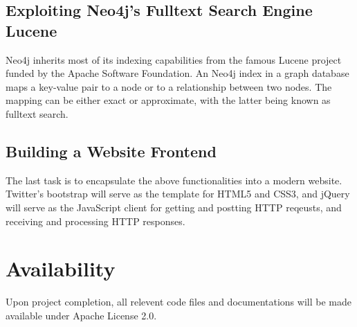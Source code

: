 \documentclass[10pt,conference,compsocconf]{../IEEEtran}
\begin{document}
\subsection{Exploiting Neo4j's Fulltext Search Engine Lucene}

Neo4j inherits most of its indexing capabilities from the famous Lucene project funded by the Apache Software Foundation. An Neo4j index in a graph database maps a key-value pair to a node or to a relationship between two nodes. The mapping can be either exact or approximate, with the latter being known as fulltext search.

\subsection{Building a Website Frontend}

The last task is to encapsulate the above functionalities into a modern website. Twitter's bootstrap will serve as the template for HTML5 and CSS3, and jQuery will serve as the JavaScript client for getting and postting HTTP reqeusts, and receiving and processing HTTP responses.

\section{Availability}

Upon project completion, all relevent code files and documentations will be made available under Apache License 2.0.






\end{document}
